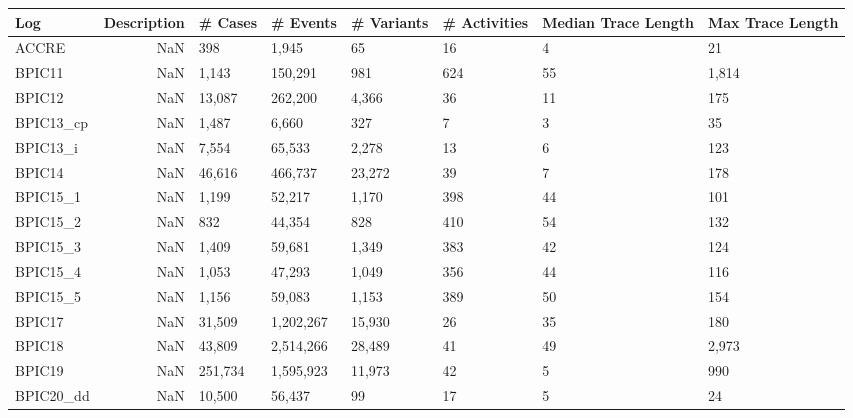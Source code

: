 \begin{tabular}{lrllllll}
\toprule
       Log &  Description & \# Cases & \# Events & \# Variants & \# Activities & Median Trace Length & Max Trace Length \\
\midrule
     ACCRE &          NaN &      398 &     1,945 &          65 &            16 &                   4 &               21 \\
    BPIC11 &          NaN &    1,143 &   150,291 &         981 &           624 &                  55 &            1,814 \\
    BPIC12 &          NaN &   13,087 &   262,200 &       4,366 &            36 &                  11 &              175 \\
 BPIC13_cp &          NaN &    1,487 &     6,660 &         327 &             7 &                   3 &               35 \\
  BPIC13_i &          NaN &    7,554 &    65,533 &       2,278 &            13 &                   6 &              123 \\
    BPIC14 &          NaN &   46,616 &   466,737 &      23,272 &            39 &                   7 &              178 \\
  BPIC15_1 &          NaN &    1,199 &    52,217 &       1,170 &           398 &                  44 &              101 \\
  BPIC15_2 &          NaN &      832 &    44,354 &         828 &           410 &                  54 &              132 \\
  BPIC15_3 &          NaN &    1,409 &    59,681 &       1,349 &           383 &                  42 &              124 \\
  BPIC15_4 &          NaN &    1,053 &    47,293 &       1,049 &           356 &                  44 &              116 \\
  BPIC15_5 &          NaN &    1,156 &    59,083 &       1,153 &           389 &                  50 &              154 \\
    BPIC17 &          NaN &   31,509 & 1,202,267 &      15,930 &            26 &                  35 &              180 \\
    BPIC18 &          NaN &   43,809 & 2,514,266 &      28,489 &            41 &                  49 &            2,973 \\
    BPIC19 &          NaN &  251,734 & 1,595,923 &      11,973 &            42 &                   5 &              990 \\
 BPIC20_dd &          NaN &   10,500 &    56,437 &          99 &            17 &                   5 &               24 \\

\end{tabular}
